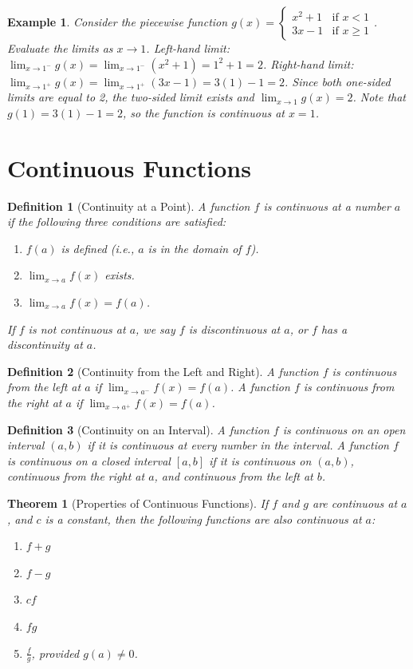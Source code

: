 \documentclass[11pt,a4paper]{article}
\newtheorem{example}{Example}
\newtheorem{theorem}{Theorem}
\newtheorem{definition}{Definition}
\begin{document}
\begin{example}
Consider the piecewise function $g(x) = \begin{cases} x^2 + 1 & \text{if } x < 1 \\ 3x - 1 & \text{if } x \geq 1 \end{cases}$. Evaluate the limits as $x \to 1$.
Left-hand limit: $\lim_{x \to 1^-} g(x) = \lim_{x \to 1^-} (x^2 + 1) = 1^2 + 1 = 2$.
Right-hand limit: $\lim_{x \to 1^+} g(x) = \lim_{x \to 1^+} (3x - 1) = 3(1) - 1 = 2$.
Since both one-sided limits are equal to 2, the two-sided limit exists and $\lim_{x \to 1} g(x) = 2$. Note that $g(1) = 3(1) - 1 = 2$, so the function is continuous at $x = 1$.
\end{example}
\section{Continuous Functions}
\begin{definition}[Continuity at a Point]
A function $f$ is \textit{continuous at a number} $a$ if the following three conditions are satisfied:
\begin{enumerate}
\item $f(a)$ is defined (i.e., $a$ is in the domain of $f$).
\item $\displaystyle \lim_{x \to a} f(x)$ exists.
\item $\displaystyle \lim_{x \to a} f(x) = f(a)$.
\end{enumerate}
If $f$ is not continuous at $a$, we say $f$ is \textit{discontinuous at $a$}, or $f$ has a \textit{discontinuity} at $a$.
\end{definition}
\begin{definition}[Continuity from the Left and Right]
A function $f$ is \textit{continuous from the left} at $a$ if $\displaystyle \lim_{x \to a^-} f(x) = f(a)$.
A function $f$ is \textit{continuous from the right} at $a$ if $\displaystyle \lim_{x \to a^+} f(x) = f(a)$.
\end{definition}
\begin{definition}[Continuity on an Interval]
A function $f$ is \textit{continuous on an open interval} $(a, b)$ if it is continuous at every number in the interval.
A function $f$ is \textit{continuous on a closed interval} $[a, b]$ if it is continuous on $(a, b)$, continuous from the right at $a$, and continuous from the left at $b$.
\end{definition}
\begin{theorem}[Properties of Continuous Functions]
If $f$ and $g$ are continuous at $a$, and $c$ is a constant, then the following functions are also continuous at $a$:
\begin{enumerate}
\item $f + g$
\item $f - g$
\item $c f$
\item $f g$
\item $\displaystyle \frac{f}{g}$, provided $g(a) \neq 0$.
\end{enumerate}
\end{theorem}
\end{document}
